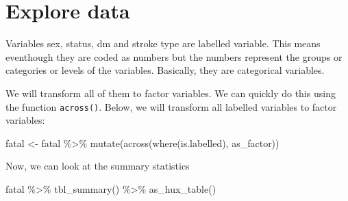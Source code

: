 \documentclass[
  10pt,
]{krantz}
\newenvironment{Shaded}{\begin{snugshade}}{\end{snugshade}}
\newcommand{\FunctionTok}[1]{\textcolor[rgb]{0.00,0.00,0.00}{#1}}
\newcommand{\NormalTok}[1]{#1}
\newcommand{\OtherTok}[1]{\textcolor[rgb]{0.56,0.35,0.01}{#1}}
\newcommand{\SpecialCharTok}[1]{\textcolor[rgb]{0.00,0.00,0.00}{#1}}
\begin{document}
\hypertarget{explore-data}{%
\section{Explore data}\label{explore-data}}

Variables sex, status, dm and stroke type are labelled variable. This means eventhough they are coded as numbers but the numbers represent the groups or categories or levels of the variables. Basically, they are categorical variables.

We will transform all of them to factor variables. We can quickly do this using the function \texttt{across()}. Below, we will transform all labelled variables to factor variables:

\begin{Shaded}
\begin{Highlighting}[]
\NormalTok{fatal }\OtherTok{\textless{}{-}} 
\NormalTok{  fatal }\SpecialCharTok{\%\textgreater{}\%}
  \FunctionTok{mutate}\NormalTok{(}\FunctionTok{across}\NormalTok{(}\FunctionTok{where}\NormalTok{(is.labelled), as\_factor))}
\end{Highlighting}
\end{Shaded}

Now, we can look at the summary statistics

\begin{Shaded}
\begin{Highlighting}[]
\NormalTok{fatal }\SpecialCharTok{\%\textgreater{}\%}
  \FunctionTok{tbl\_summary}\NormalTok{() }\SpecialCharTok{\%\textgreater{}\%}
  \FunctionTok{as\_hux\_table}\NormalTok{()}
\end{Highlighting}
\end{Shaded}

 
  \providecommand{\huxb}[2]{\arrayrulecolor[RGB]{#1}\global\arrayrulewidth=#2pt}
  \providecommand{\huxvb}[2]{\color[RGB]{#1}\vrule width #2pt}
  \providecommand{\huxtpad}[1]{\rule{0pt}{#1}}
  \providecommand{\huxbpad}[1]{\rule[-#1]{0pt}{#1}}
\end{document}
